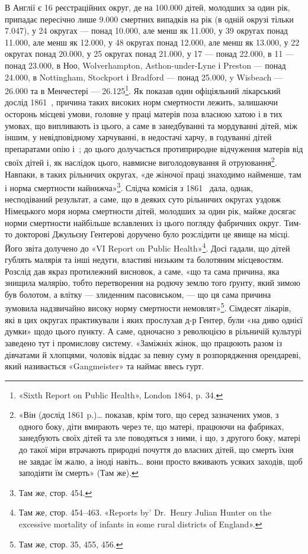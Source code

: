 \parcont{}  %
В Англії є 16 реєстраційних округ, де на \num{100.000} дітей, молодших
за один рік, припадає пересічно лише \num{9.000} смертних випадків
на рік (в одній окрузі тільки \num{7.047}), у 24 округах — понад \num{10.000},
але менш як \num{11.000}, у 39 округах понад \num{11.000}, але менш як \num{12.000},
у 48 округах понад \num{12.000}, але менш як \num{13.000}, у 22 округах
понад \num{20.000}, у 25 округах понад \num{21.000}, у 17 — понад \num{22.000},
в 11 — понад \num{23.000}, в Ноо, Wolverhampton, Asthon-under-Lyne
і Preston — понад \num{24.000}, в Nottingham, Stockport і Bradford —
понад \num{25.000}, y Wisbeach — \num{26.000} та в Менчестері — \num{26.125}\footnote{
«Sixth Report on Public Health», London 1864, p. 34.
}.
Як показав один офіціяльний лікарський дослід 1861~, причина
таких високих норм смертности лежить, залишаючи осторонь
місцеві умови, головне у праці матерів поза власною хатою і в
тих умовах, що випливають із цього, а саме в занедбуванні та
мордуванні дітей, між іншим, у невідповідному харчуванні, в
недостачі харчу, в годуванні дітей препаратами опію і~;
до цього долучається протиприродне відчуження матерів від
своїх дітей і, як наслідок цього, навмисне виголодовування й
отруювання\footnote{
«Він (дослід 1861 p.)\dots{} показав, крім того, що серед зазначених
умов, з одного боку, діти вмирають через те, що матері, працюючи на фабриках,
занедбують своїх дітей та зле поводяться з ними, і що, з другого
боку, матері до такої міри втрачають природні почуття до власних
дітей, що смерть їхня не завдає їм жалю, а іноді навіть\dots{} вони просто вживають
усяких заходів, щоб заподіяти їм смерть» (Там же).
}. Навпаки, в таких рільничих округах, «де жіночої
праці знаходимо найменше, там і норма смертности найнижча»\footnote{
Там же, стор. 454.
}.
Слідча комісія з 1861~ дала, однак, несподіваний результат,
а саме, що в деяких суто рільничих округах уздовж Німецького
моря норма смертности дітей, молодших за один рік, майже
досягає норми смертности найбільше вславлених із цього погляду
фабричних округ. Тим-то докторові Джульєну Гентерові доручено
було розслідити це явище на місці. Його звіта долучено до
«VI Report on Public Health»\footnote{
Там же, стор. 454--463. «Reports by' Dr.~Henry Julian Hunter
on the excessive mortality of infants in some rural districts of England».
}. Досі гадали, що дітей гублять малярія
та інші недуги, властиві низьким та болотяним місцевостям.
Розслід дав якраз протилежний висновок, а саме, «що та сама
причина, яка знищила малярію, тобто перетворення на родючу
землю того ґрунту, який зимою був болотом, а влітку — злиденним
пасовиськом, — що ця сама причина зумовила надзвичайно
високу норму смертности немовлят»\footnote{
Там же, стор. 35, 455, 456.
}. Сімдесят лікарів, які
в цих округах практикували і яких прослухав д-р Гентер,
були «на диво однієї думки» щодо цього пункту. А саме, одночасно
з революцією в рільничій культурі заведено тут і промислову
систему. «Заміжніх жінок, що працюють разом із дівчатами й
хлопцями, чоловік віддає за певну суму в розпорядження орендареві,
який називається «Gangmeister» та наймає ввесь гурт.
\parbreak{}  %
